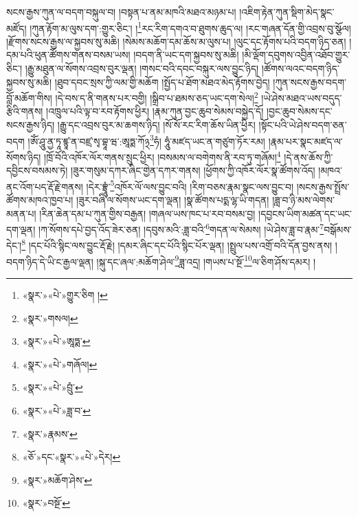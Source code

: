 སངས་རྒྱས་ཀུན་ལ་བདག་བསྐུལ་བ། །བསྟན་པ་ནམ་མཁའི་མཐའ་མཉམ་པ། །འཇིག་རྟེན་ཀུན་སྡིག་མེད་སྣང་མཛོད། །ཀུན་རྟོག་མ་ལུས་དག་:གྱུར་ཅིང་། །\footnote{«སྣར་»«པེ་»གྱུར་ཅིག །}རང་རིག་དགའ་བ་ཐུགས་ཆུད་ལ། །རང་གཞན་དོན་གྱི་འབྲས་བུ་སྩོལ། །རྫོགས་སངས་རྒྱས་ལ་སྐྱབས་སུ་མཆི། །སེམས་མཆོག་དམ་ཆོས་མ་ལུས་པ། །ལུང་དང་རྟོགས་པའི་བདག་ཉིད་ཅན། །དམ་པའི་ཕུན་ཚོགས་གནས་བསམ་ཡས། །བདག་ནི་ཡང་དག་སྐྱབས་སུ་མཆི། །མི་ལྡོག་དབུགས་འབྱིན་འཐོབ་གྱུར་ཅིང་། །རྒྱུ་མཐུན་ལ་སོགས་འབྲས་བུར་ལྡན། །གསང་བའི་དབང་བསྐུར་ལས་བྱུང་ཉིད། །ཚོགས་ལའང་བདག་ཉིད་སྐྱབས་སུ་མཆི། །ཐུབ་དབང་སྲས་ཀྱི་ལམ་གྱི་མཆོག །སྤྱོད་པ་ཐོག་མཐའ་མེད་རྟོགས་བྱེད། །ཀུན་སངས་རྒྱས་བདག་བློ་མཆོག་གིས། །དེ་བས་ད་ནི་གནས་པར་བགྱི། །སྒྲིབ་པ་ཐམས་ཅད་ཡང་དག་སེལ།\footnote{«སྣར་»གསལ།} །ཡེ་ཤེས་མཐའ་ཡས་བདུད་རྩིའི་གནས། །འཁྲུལ་པའི་ལྟ་བ་རབ་རྟོགས་ཕྱིར། །རྣམ་ཀུན་བྱང་ཆུབ་སེམས་བསྐྱེད་དོ། །བྱང་ཆུབ་སེམས་དང་སངས་རྒྱས་ཉིད། །རྒྱུ་དང་འབྲས་བུར་མ་ཆགས་ཉིད། །སོ་སོ་རང་རིག་ཆོས་ཡིན་ཕྱིར། །སྟོང་པའི་ཡེ་ཤེས་བདག་ཅན་བདག །ཨོཾ་ཤཱུ་ནྱ་ཏཱ་ཛྙཱ་ན་བཛྲ་སྭ་བྷཱ་ཝ་:ཨཱཏྨ་ཀོ྅\footnote{«སྣར་»«པེ་»ཨཱཏྨ་}ཧཾ། ཧཱུཾ་མཛད་ཡང་ན་གཙུག་ཏོར་རམ། །རྣམ་པར་སྣང་མཛད་ལ་སོགས་ཉིད། །ཁྲོ་བོའི་འཁོར་ལོར་གནས་སྲུང་ཕྱིར། །བསམས་ལ་བགེགས་ནི་རབ་ཏུ་གཞོམ།\footnote{«སྣར་»«པེ་»གཞོལ།} །དེ་ནས་ཆོས་ཀྱི་དབྱིངས་བསམས་ཏེ། །ཟུར་གསུམ་དཀར་ཞིང་གྱེན་དཀར་གནས། །ཕྱོགས་ཀྱི་འཁོར་ལོར་སྣ་ཚོགས་འོད། །མཁའ་ནང་འོག་པད་རྡོ་རྗེ་གནས། །དེར་བྷྲཱུཾ་\footnote{«སྣར་»«པེ་»བྲུཾ་}འཁོར་ལོ་ལས་བྱུང་བའི། །རིག་བཅས་རྣམ་སྣང་ལས་བྱུང་བ། །སངས་རྒྱས་སྤྲོས་ཚོགས་མཁའ་ཁྱབ་པ། །ཟུར་བཞི་ལ་སོགས་ཡང་དག་ལྡན། །སྣ་ཚོགས་པདྨ་ལྷ་ཡི་གདན། །ཟླ་བ་ཉི་མས་ལེགས་མནན་པ། །རིན་ཆེན་དམ་པ་ཀུན་གྱིས་བརྒྱན། །གཞལ་ཡས་ཁང་པ་རབ་བསམ་བྱ། །དབྱངས་ཡིག་མཚན་དང་ཡང་དག་ལྡན། །ཀ་སོགས་དཔེ་བྱད་འོད་ཟེར་ཅན། །དབུས་མའི་:ཟླ་བའི་\footnote{«སྣར་»«པེ་»ཟླ་བ་}གདན་ལ་སེམས། །ཡེ་ཤེས་ཟླ་བ་རྣམ་\footnote{«སྣར་»རྣམས་}བསྒོམས་དེང་།\footnote{«ཅོ་»དང་«སྣར་»«པེ་»དེར།} །དང་པོའི་སྙིང་ལས་བྱུང་རྡོ་རྗེ། །དམར་ཞིང་དང་པོའི་སྙིང་པོར་ལྡན། །སྤྲུལ་པས་འགྲོ་བའི་དོན་བྱས་ནས། །བདག་ཉིད་དེ་ཡི་ང་རྒྱལ་ལྡན། །སྐུ་དང་ཞལ་:མཆོག་ཤེལ་\footnote{«སྣར་»མཆོག་ཤེས་}ཟླ་འདྲ། །གཡས་པ་སྔོ་\footnote{«སྣར་»བསྔོ་}ལ་ཅིག་ཤོས་དམར། །
